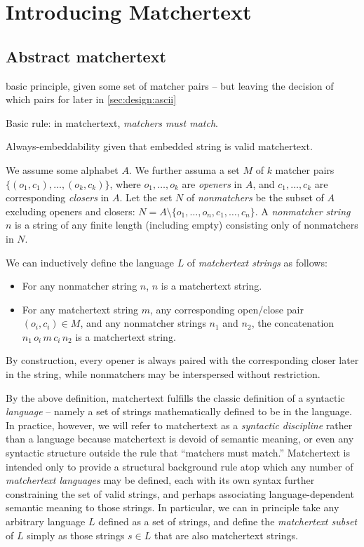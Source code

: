 \section{Introducing Matchertext}
\label{sec:design}

\subsection{Abstract matchertext}

basic principle, given some set of matcher pairs --
but leaving the decision of which pairs for later in
\cref{sec:design:ascii}

Basic rule: in matchertext, \emph{matchers must match}.

Always-embeddability given that embedded string is valid matchertext.

We assume some alphabet $A$.
We further assuma a set $M$ of $k$ matcher pairs
$\{(o_1,c_1),\dots,(o_k,c_k)\}$,
where $o_1,\dots,o_k$ are \emph{openers} in $A$,
and $c_1,\dots,c_k$ are corresponding \emph{closers} in $A$.
Let the set $N$ of \emph{nonmatchers} be the subset of $A$
excluding openers and closers:
\ie $N = A \setminus \{o_1,\dots,o_n,c_1,\dots,c_n\}$.
A \emph{nonmatcher string} $n$ is a string of any finite length
(including empty)
consisting only of nonmatchers in $N$.

We can inductively define the language $L$ of \emph{matchertext strings}
as follows:
\begin{itemize}
\item	For any nonmatcher string $n$,
	$n$ is a matchertext string.
\item	For any matchertext string $m$,
	any corresponding open/close pair $(o_i,c_i) \in M$,
	and any nonmatcher strings $n_1$ and $n_2$,
	the concatenation $n_1\,o_i\,m\,c_i\,n_2$ is a matchertext string.
\end{itemize}

By construction, every opener is always paired
with the corresponding closer later in the string,
while nonmatchers may be interspersed without restriction.

By the above definition,
matchertext fulfills the classic definition of a syntactic \emph{language} --
namely a set of strings mathematically defined to be in the language.
In practice, however,
we will refer to matchertext as a \emph{syntactic discipline}
rather than a language
because matchertext is devoid of semantic meaning,
or even any syntactic structure outside the rule that ``matchers must match.''
Matchertext is intended only to provide a structural background rule
atop which any number of \emph{matchertext languages} may be defined,
each with its own syntax further constraining the set of valid strings,
and perhaps associating language-dependent semantic meaning to those strings.
In particular, we can in principle take any arbitrary language $L$
defined as a set of strings,
and define the \emph{matchertext subset} of $L$
simply as those strings $s \in L$ that are also matchertext strings.




